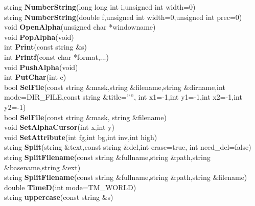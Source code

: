 \documentclass[10pt,titlepage]{article}
\def\functionlistentry#1#2#3#4#5#6{\noindent #1 {\bf #2}(#3) \dotfill #6\\}
\begin{document}
{{\functionlistentry{string}{NumberString}{long long int i,unsigned int width=0}{1407}{genericTools}{}
\functionlistentry{string}{NumberString}{double f,unsigned int width=0,unsigned int prec=0}{1408}{genericTools}{}
\functionlistentry{void}{OpenAlpha}{unsigned char *windowname}{1416}{genericTools}{}
\functionlistentry{void}{PopAlpha}{void}{1420}{genericTools}{}
\functionlistentry{int}{Print}{const string \&s}{1432}{genericTools}{}
\functionlistentry{int}{Printf}{const char *format,...}{1431}{genericTools}{}
\functionlistentry{void}{PushAlpha}{void}{1419}{genericTools}{}
\functionlistentry{int}{PutChar}{int c}{1428}{genericTools}{}
\functionlistentry{bool}{SelFile}{const string \&mask,string \&filename,string \&dirname,int mode=DIR\_FILE,const string \&title='''', int x1=-1,int y1=-1,int x2=-1,int y2=-1}{1449}{genericTools}{}
\functionlistentry{bool}{SelFile}{const string \&mask, string \&filename}{1450}{genericTools}{}
\functionlistentry{void}{SetAlphaCursor}{int x,int y}{1422}{genericTools}{}
\functionlistentry{void}{SetAttribute}{int fg,int bg,int inv,int high}{1427}{genericTools}{}
\functionlistentry{string}{Split}{string \&text,const string \&del,int erase=true, int need\_del=false}{1413}{genericTools}{}
\functionlistentry{string}{SplitFilename}{const string \&fullname,string \&path,string \&basename,string \&ext}{1414}{genericTools}{}
\functionlistentry{string}{SplitFilename}{const string \&fullname,string \&path,string \&filename}{1415}{genericTools}{}
\functionlistentry{double}{TimeD}{int mode=TM\_WORLD}{1444}{genericTools}{}
\functionlistentry{string}{uppercase}{const string \&s}{1412}{genericTools}{}

}}
\end{document}
